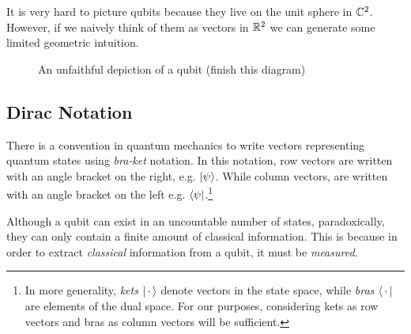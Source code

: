         It is very hard to picture qubits because they live on the unit sphere in $\mathbb{C}^2$. However, if we naively 
        think of them as vectors in $\mathbb{R}^2$ we can generate some limited geometric intuition. 
        
        \begin{figure}[ht]
            \centering
            \begin{center}
            \end{center}
            \caption{An unfaithful depiction of a qubit (finish this diagram)}
        \end{figure}
        
    \subsection{Dirac Notation}

        There is a convention in quantum mechanics to write vectors representing quantum states using 
        \emph{bra-ket} notation. In this notation, row vectors are written with an angle bracket on the right, e.g.
        $\ket{\psi}$. While column vectors, are written with an angle bracket on the left e.g.
        $\bra{\psi}$.\footnote{In more generality, \emph{kets} $\ket{\, \cdot \,}$ denote vectors in the state 
        space, while \emph{bras} $\bra{\, \cdot \,}$ are elements of the dual space. For our purposes, considering 
    kets as row vectors and bras as column vectors will be sufficient.}


       



        
        Although a qubit can exist in an uncountable number of states, paradoxically, they can only contain a 
        finite amount of classical information. This is because in order to extract \emph{classical} information 
        from a qubit, it must be \emph{measured}. 


